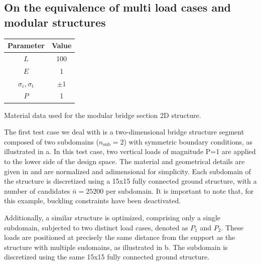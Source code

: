 \subsection{On the equivalence of multi load cases and modular structures}
\begin{margintable}
    \small
    \centering
    \begin{tabular}{cc}
    \toprule
    \textbf{Parameter}        & \textbf{Value} \\ \midrule
    $L$              & 100     \\
    $E$              & 1     \\
    $\sigma_\text{c}, \sigma_\text{t}$ & $\pm 1$\\
    $P$              & 1   \\
    \bottomrule
    \end{tabular}
    \caption{Material data used for the modular bridge section 2D structure.}
    \label{tab:05_modular_data}
\end{margintable}
The first test case we deal with is a two-dimensional bridge structure segment composed of two subdomains ($n_{\text{sub}} = 2$) with symmetric boundary conditions, as illustrated in a. In this test case, two vertical loads of magnitude P=1 are applied to the lower side of the design space. The material and geometrical details are given in  and are normalized and adimensional for simplicity. Each subdomain of the structure is discretized using a 15x15 fully connected ground structure, with a number of candidates $\bar{n}=25200$ per subdomain. It is important to note that, for this example, buckling constraints have been deactivated.

Additionally, a similar structure is optimized, comprising only a single subdomain, subjected to two distinct load cases, denoted as $P_1$ and $P_2$. These loads are positioned at precisely the same distance from the support as the structure with multiple sudomains, as illustrated in b. The subdomain is discretized using the same 15x15 fully connected ground structure.

